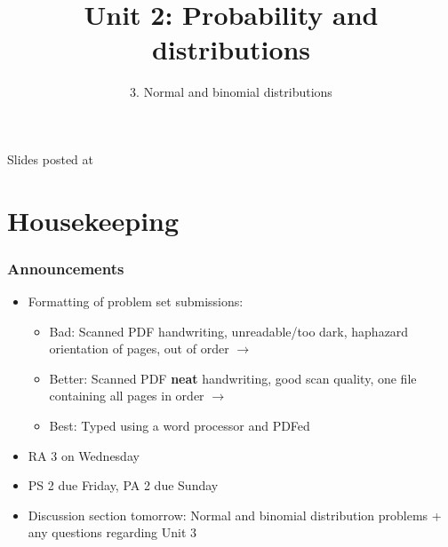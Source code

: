 \documentclass[slidestop,compress,mathserif,12pt,t,professionalfonts,xcolor=table]{beamer}
\title{Unit 2: Probability and distributions}
\subtitle{3. Normal and binomial distributions}
\author{\CourseName}
\date{}
\institute{\InstituteName}
\begin{document}



\begin{frame}[plain]

\titlepage

\vfill

{\scriptsize {} \hfill Slides posted at  \webURL{\CourseSite}}

\addtocounter{framenumber}{-1} 

\end{frame}


\section{Housekeeping}


\begin{frame}
\frametitle{Announcements}

\begin{itemize}

\item Formatting of problem set submissions:
\begin{itemize}
\item Bad: Scanned PDF handwriting, unreadable/too dark, haphazard orientation of pages, out
of order $\rightarrow$ 
\item Better: Scanned PDF \textbf{neat} handwriting, good scan quality, one file containing
all pages in order $\rightarrow$ 
\item Best: Typed using a word processor and PDFed
\end{itemize}

\item RA 3 on Wednesday

\item PS 2 due Friday, PA 2 due Sunday

\item Discussion section tomorrow: Normal and binomial distribution problems + any questions regarding Unit 3

\end{itemize}

\end{frame}
\end{document}
